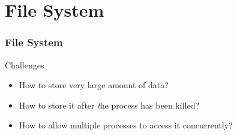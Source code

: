 \section{File System}
\begin{frame}
  \frametitle{File System}
  \begin{block}{Challenges}
    \begin{itemize}
      \item How to store very large amount of data?
      \item How to store it after {\emph the} process has been killed?
      \item How to allow multiple processes to access it concurrently?
    \end{itemize}
  \end{block}
\end{frame}

